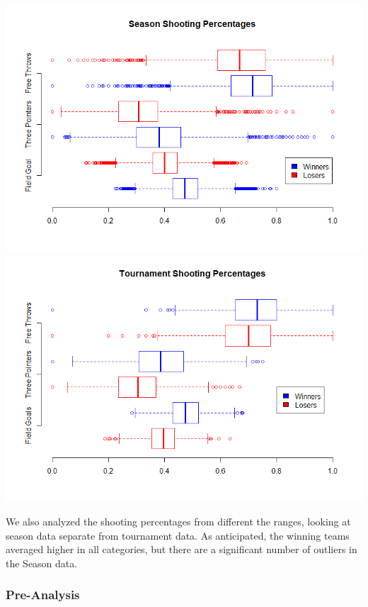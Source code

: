 \documentclass[11pt]{beamer}
\begin{document}
\begin{frame}
\begin{center}
	\includegraphics[scale=0.255]{SeasonShotPercent.png}
	\includegraphics[scale=0.255]{TourneyShotPercent.png}  
\end{center}
\footnotesize \center We also analyzed the shooting percentages from different the ranges, looking at season data separate from tournament data. As anticipated, the winning teams averaged higher in all categories, but there are a significant number of outliers in the Season data.
\frametitle{{\textbf{\huge Pre-Analysis}}}
\end{frame}
\end{document}
